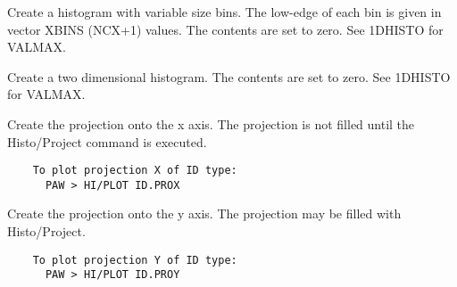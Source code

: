    \par
Create a histogram with variable size bins.  The low-edge of each bin is 
   given in vector XBINS (NCX+1) values.  The contents are set to zero. See 
   1DHISTO for VALMAX.  

\ENDCMD


\BEGARG
{}
\ENDARG

   \par
Create a two dimensional histogram.  The contents are set to zero. See 
   1DHISTO for VALMAX.  

\ENDCMD


\BEGARG
{}
\ENDARG

   \par
Create the projection onto the x axis.  The projection is not filled until 
   the Histo/Project command is executed.  
\begin{verbatim}
    To plot projection X of ID type:
      PAW > HI/PLOT ID.PROX
\end{verbatim}

\ENDCMD


\BEGARG
{}
\ENDARG

   \par
Create the projection onto the y axis.  The projection may be filled with 
   Histo/Project.  
\begin{verbatim}
    To plot projection Y of ID type:
      PAW > HI/PLOT ID.PROY
\end{verbatim}

\ENDCMD


\BEGARG
{}
\ENDARG

